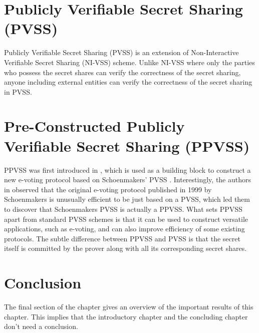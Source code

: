 \section{Publicly Verifiable Secret Sharing (PVSS)}
\label{sec:pvss}
Publicly Verifiable Secret Sharing (PVSS) is an extension of Non-Interactive Verifiable Secret Sharing 
(NI-VSS) scheme. Unlike NI-VSS where only the parties who possess the secret shares can verify the 
correctness of the secret sharing, anyone including external entities can verify the correctness of 
the secret sharing in PVSS. 

\section{Pre-Constructed Publicly Verifiable Secret Sharing (PPVSS)}
\label{sec:ppvss}
PPVSS was first introduced in \cite{cryptoeprint:2025/576}, which is used as a building block to 
construct a new e-voting protocol based on Schoenmakers' PVSS \cite{5581ccd9530540479539d21d1d39ae96}. 
Interestingly, the authors in \cite{cryptoeprint:2025/576} observed that the original e-voting protocol 
published in 1999 by Schoenmakers is unusually efficient to be just based on a PVSS, which led them to 
discover that Schoenmakers PVSS is actually a PPVSS. What sets PPVSS apart from standard PVSS schemes 
is that it can be used to construct versatile applications, such as e-voting, and can also improve 
efficiency of some existing protocols. The subtle difference between PPVSS and PVSS is that the secret 
itself is committed by the prover along with all its corresponding secret shares.

\section{Conclusion}
The final section of the chapter gives an overview of the important results
of this chapter. This implies that the introductory chapter and the
concluding chapter don't need a conclusion.

